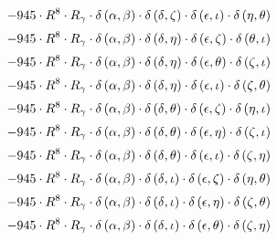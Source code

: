 \begin{subequations}
\begin{gather}
 \\[0.2em] \notag 		 - 945 \cdot R^{8} \cdot R_{\gamma{}} \cdot \delta{}\left(\alpha{}, \beta{}\right) \cdot \delta{}\left(\delta{}, \zeta{}\right) \cdot \delta{}\left(\epsilon{}, \iota{}\right) \cdot \delta{}\left(\eta{}, \theta{}\right) 
 \\[0.2em] \notag 		 - 945 \cdot R^{8} \cdot R_{\gamma{}} \cdot \delta{}\left(\alpha{}, \beta{}\right) \cdot \delta{}\left(\delta{}, \eta{}\right) \cdot \delta{}\left(\epsilon{}, \zeta{}\right) \cdot \delta{}\left(\theta{}, \iota{}\right) 
 \\[0.2em] \notag 		 - 945 \cdot R^{8} \cdot R_{\gamma{}} \cdot \delta{}\left(\alpha{}, \beta{}\right) \cdot \delta{}\left(\delta{}, \eta{}\right) \cdot \delta{}\left(\epsilon{}, \theta{}\right) \cdot \delta{}\left(\zeta{}, \iota{}\right) 
 \\[0.2em] \notag 		 - 945 \cdot R^{8} \cdot R_{\gamma{}} \cdot \delta{}\left(\alpha{}, \beta{}\right) \cdot \delta{}\left(\delta{}, \eta{}\right) \cdot \delta{}\left(\epsilon{}, \iota{}\right) \cdot \delta{}\left(\zeta{}, \theta{}\right) 
 \\[0.2em] \notag 		 - 945 \cdot R^{8} \cdot R_{\gamma{}} \cdot \delta{}\left(\alpha{}, \beta{}\right) \cdot \delta{}\left(\delta{}, \theta{}\right) \cdot \delta{}\left(\epsilon{}, \zeta{}\right) \cdot \delta{}\left(\eta{}, \iota{}\right) 
 \\[0.2em] \notag 		 - 945 \cdot R^{8} \cdot R_{\gamma{}} \cdot \delta{}\left(\alpha{}, \beta{}\right) \cdot \delta{}\left(\delta{}, \theta{}\right) \cdot \delta{}\left(\epsilon{}, \eta{}\right) \cdot \delta{}\left(\zeta{}, \iota{}\right) 
 \\[0.2em] \notag 		 - 945 \cdot R^{8} \cdot R_{\gamma{}} \cdot \delta{}\left(\alpha{}, \beta{}\right) \cdot \delta{}\left(\delta{}, \theta{}\right) \cdot \delta{}\left(\epsilon{}, \iota{}\right) \cdot \delta{}\left(\zeta{}, \eta{}\right) 
 \\[0.2em] \notag 		 - 945 \cdot R^{8} \cdot R_{\gamma{}} \cdot \delta{}\left(\alpha{}, \beta{}\right) \cdot \delta{}\left(\delta{}, \iota{}\right) \cdot \delta{}\left(\epsilon{}, \zeta{}\right) \cdot \delta{}\left(\eta{}, \theta{}\right) 
 \\[0.2em] \notag 		 - 945 \cdot R^{8} \cdot R_{\gamma{}} \cdot \delta{}\left(\alpha{}, \beta{}\right) \cdot \delta{}\left(\delta{}, \iota{}\right) \cdot \delta{}\left(\epsilon{}, \eta{}\right) \cdot \delta{}\left(\zeta{}, \theta{}\right) 
 \\[0.2em] \notag 		 - 945 \cdot R^{8} \cdot R_{\gamma{}} \cdot \delta{}\left(\alpha{}, \beta{}\right) \cdot \delta{}\left(\delta{}, \iota{}\right) \cdot \delta{}\left(\epsilon{}, \theta{}\right) \cdot \delta{}\left(\zeta{}, \eta{}\right) 

\end{gather}
\end{subequations}
